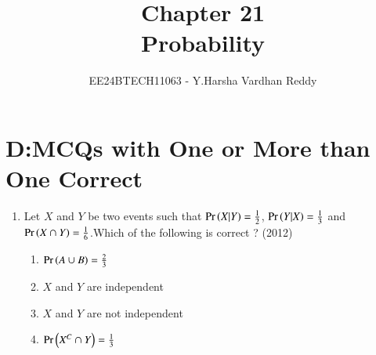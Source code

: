 \documentclass[journal,,12pt,onecolumn]{IEEEtran}
\theoremstyle{remark}
\begin{document}

\vspace{3cm}

\title{Chapter 21\\Probability}
\author{EE24BTECH11063 - Y.Harsha Vardhan Reddy}
\maketitle

\bigskip

\renewcommand{\thefigure}{\theenumi}
\renewcommand{\thetable}{\theenumi}

\section*{D:MCQs with One or More than One Correct}
\begin{enumerate}
    \item Let $X$ and $Y$ be two events such that $\Pr\left(X|Y\right)=\frac{1}{2}$, $\Pr\left(Y|X\right)=\frac{1}{3}$ and $\Pr\left(X\cap Y\right)=\frac{1}{6}$.Which of the following is  correct ?
    \hfill{(2012)}
    \begin{enumerate}
    
        
    
        \item $\Pr\left(A\cup B\right)=\frac{2}{3}$
        \item $X$ and $Y$ are independent 
        \item $X$ and $Y$ are not independent
        \item $\Pr\left(X^C \cap Y\right)=\frac{1}{3}$ 
        

\end{enumerate}
\end{enumerate}
\end{document}
